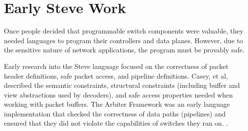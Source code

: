 %



\section{Early Steve Work}

Once people decided that programmable switch components were valuable,
they needed languages to program their controllers and data planes.
However, due to the sensitive nature of network applications, the program must be provably safe.

Early research into the Steve language focused on the correctness of packet
header definitions, safe packet access, and pipeline definitions.
Casey, et al, described the semantic constraints,
structural constraints (including buffer and view abstractions used by decoders), and 
safe access properties needed when working with packet buffers.
The Arbiter Framework was an early language implementation that checked the correctness of data paths (pipelines) and ensured that they did not violate the 
capabilities of switches they ran on.
\cite{arbiter}.

